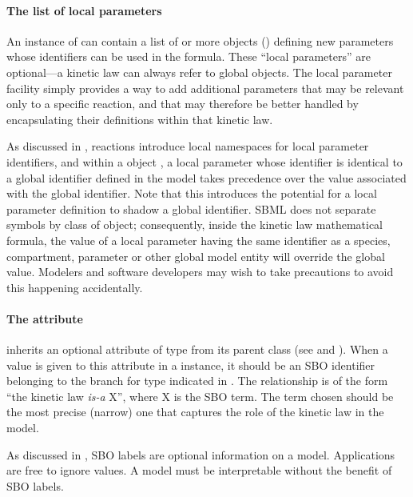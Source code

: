 \paragraph{The list of local parameters}

An instance of \KineticLaw can contain a list of  or more
\LocalParameter objects ()
defining new parameters whose identifiers can be used in the
 formula.  These ``local parameters'' are optional---a
kinetic law can always refer to global \Parameter objects.  The
local parameter facility simply provides a way to add additional
parameters that may be relevant only to a specific reaction, and
that may therefore be better handled by encapsulating their
definitions within that kinetic law.

As discussed in , reactions introduce
local namespaces for local parameter identifiers, and within a
\KineticLaw object , a local parameter whose identifier is
identical to a global identifier defined in the model takes
precedence over the value associated with the global identifier.
Note that this introduces the potential for a local parameter
definition to shadow a global identifier.  SBML does not separate
symbols by class of object; consequently, inside the kinetic law
mathematical formula, the value of a local parameter having the
same identifier as a species, compartment, parameter or other
global model entity will override the global value.  Modelers and
software developers may wish to take precautions to avoid this
happening accidentally.


\paragraph{The  attribute}

\KineticLaw  inherits an optional 
attribute of type  from its parent
class \SBase (see 
and ).  When a value is given to this
attribute in a  \KineticLaw instance, it should be an
SBO identifier belonging to the branch for type  \KineticLaw
indicated in .  The relationship is
of the form ``the kinetic law \emph{is-a} X'', where X is
the SBO term.  The term chosen should be the most precise (narrow)
one that captures the role of the kinetic law in the model.

As discussed in , SBO labels are optional
information on a model.  Applications are free to ignore
 values.  A model must be interpretable without the
benefit of SBO labels.


